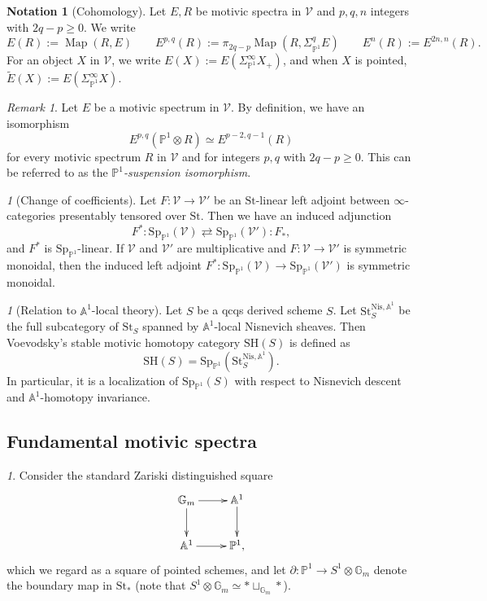 \documentclass{amsart}
\theoremstyle{plain}
\theoremstyle{definition}
\newtheorem{notation}[theorem]{Notation}
\theoremstyle{remark}
\newtheorem{remark}[theorem]{Remark}
\newtheorem{p}[theorem]{}
\numberwithin{equation}{theorem}
\newcommand{\mbb}[1]{\mathbb{#1}}
\newcommand{\mrm}[1]{\mathrm{#1}}
\newcommand{\St}{\mathrm{St}}
\newcommand{\V}{\mathcal{V}}
\newcommand{\SigmaP}{\Sigma_{\mathbb{P}^1}}
\newcommand{\SpP}{\mathrm{Sp}_{\mathbb{P}^1}}
\newcommand{\Map}{\operatorname{Map}}
\begin{document}
\begin{notation}[Cohomology]\label{not:DMS}
Let $E,R$ be motivic spectra in $\V$ and $p,q,n$ integers with $2q-p\ge 0$.
We write
\[
	E(R) := \Map(R,E) \qquad
	E^{p,q}(R) := \pi_{2q-p}\Map(R,\SigmaP^qE) \qquad
	E^n(R) := E^{2n,n}(R).
\]
For an object $X$ in $\V$, we write $E(X):=E(\SigmaP^\infty X_+)$, and when $X$ is pointed, $\tilde{E}(X):=E(\SigmaP^\infty X)$.
\end{notation}

\begin{remark}
Let $E$ be a motivic spectrum in $\V$.
By definition, we have an isomorphism
\[
	E^{p,q}(\mbb{P}^1\otimes R) \simeq E^{p-2,q-1}(R)
\]
for every motivic spectrum $R$ in $\V$ and for integers $p,q$ with $2q-p\ge 0$.
This can be referred to as the \textit{$\mbb{P}^1$-suspension isomorphism}.
\end{remark}

\begin{p}[Change of coefficients]
Let $F\colon\V\to\V'$ be an $\St$-linear left adjoint between $\infty$-categories presentably tensored over $\St$.
Then we have an induced adjunction
\[
	F^* \colon \SpP(\V) \rightleftarrows \SpP(\V') \colon F_*,
\]
and $F^*$ is $\SpP$-linear.
If $\V$ and $\V'$ are multiplicative and $F\colon\V\to\V'$ is symmetric monoidal, then the induced left adjoint $F^*\colon\SpP(\V)\to\SpP(\V')$ is symmetric monoidal.
\end{p}

\begin{p}[Relation to $\mbb{A}^1$-local theory]
Let $S$ be a qcqs derived scheme $S$.
Let $\St^{\mrm{Nis},\mbb{A}^1}_S$ be the full subcategory of $\St_S$ spanned by $\mbb{A}^1$-local Nisnevich sheaves.
Then Voevodsky's stable motivic homotopy category $\mrm{SH}(S)$ is defined as
\[
	\mrm{SH}(S) = \SpP(\St^{\mrm{Nis},\mbb{A}^1}_S).
\]
In particular, it is a localization of $\SpP(S)$ with respect to Nisnevich descent and $\mbb{A}^1$-homotopy invariance.
\end{p}


\subsection{Fundamental motivic spectra}\label{FMS}

\begin{p}
Consider the standard Zariski distinguished square
\[
\xymatrix{
	\mbb{G}_m \ar[r] \ar[d] & \mbb{A}^1 \ar[d] \\
	\mbb{A}^1 \ar[r] & \mbb{P}^1,
}
\]
which we regard as a square of pointed schemes, and let $\partial\colon\mbb{P}^1\to S^1\otimes\mbb{G}_m$ denote the boundary map in $\St_*$ (note that $S^1\otimes\mbb{G}_m\simeq*\sqcup_{\mbb{G}_m}*$).
\end{p}
\end{document}
